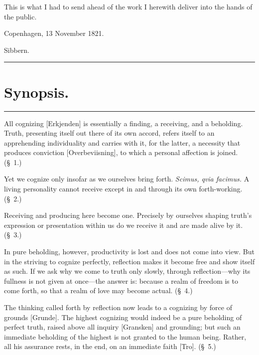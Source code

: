 \documentclass[12pt,a4paper]{book}
\begin{document}
This is what I had to send ahead of the work I herewith deliver into the hands
of the public.

\begin{flushleft}
Copenhagen, 13 November 1821.
\end{flushleft}
\begin{flushright}
Sibbern.
\end{flushright}

\begin{center}\rule{0.28\linewidth}{0.4pt}\end{center}

\chapter*{Synopsis.}

\begin{center}\rule{0.28\linewidth}{0.4pt}\end{center}

All cognizing [Erkjenden] is essentially a finding, a receiving, and a
beholding. Truth, presenting itself out there of its own accord, refers itself
to an apprehending individuality and carries with it, for the latter, a
necessity that produces conviction [Overbeviisning], to which a personal
affection is joined. (\S~1.)

Yet we cognize only insofar as we ourselves bring forth. \textit{Scimus, qvia
facimus.} A living personality cannot receive except in and through its own
forth-working. (\S~2.)

Receiving and producing here become one. Precisely by ourselves shaping truth's
expression or presentation within us do we receive it and are made alive by it.
(\S~3.)

In pure beholding, however, productivity is lost and does not come into view.
But in the striving to cognize perfectly, reflection makes it become free and
show itself as such. If we ask why we come to truth only slowly, through
reflection---why its fullness is not given at once---the answer is: because a
realm of freedom is to come forth, so that a realm of love may become actual.
(\S~4.)

The thinking called forth by reflection now leads to a cognizing by force of
grounds [Grunde]. The highest cognizing would indeed be a pure beholding of
perfect truth, raised above all inquiry [Gransken] and grounding; but such an
immediate beholding of the highest is not granted to the human being. Rather,
all his assurance rests, in the end, on an immediate faith [Tro]. (\S~5.)
\end{document}
